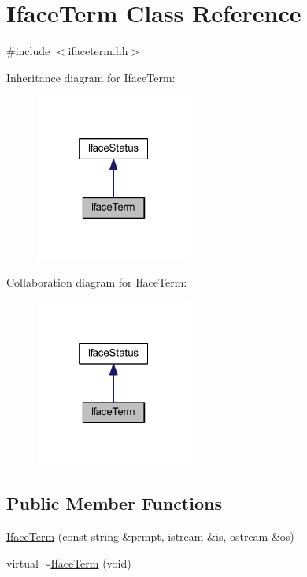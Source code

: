 \hypertarget{class_iface_term}{}\section{Iface\+Term Class Reference}
\label{class_iface_term}


{\ttfamily \#include $<$ifaceterm.\+hh$>$}



Inheritance diagram for Iface\+Term\+:
\nopagebreak
\begin{figure}[H]
\begin{center}
\leavevmode
\includegraphics[width=145pt]{class_iface_term__inherit__graph}
\end{center}
\end{figure}


Collaboration diagram for Iface\+Term\+:
\nopagebreak
\begin{figure}[H]
\begin{center}
\leavevmode
\includegraphics[width=145pt]{class_iface_term__coll__graph}
\end{center}
\end{figure}
\subsection*{Public Member Functions}
\begin{DoxyCompactItemize}
\item 
\mbox{\hyperlink{class_iface_term_a6eedea34ceeec75017bcb49d512e9b59}{Iface\+Term}} (const string \&prmpt, istream \&is, ostream \&os)
\item 
virtual \mbox{\hyperlink{class_iface_term_ae86711871edf3c58a9e8a8c463d8cbac}{$\sim$\+Iface\+Term}} (void)
\end{DoxyCompactItemize}
